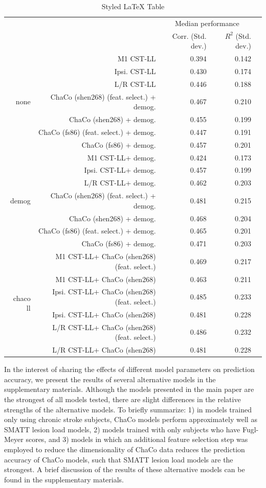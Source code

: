 \documentclass[10pt]{article}
\begin{document}
\begin{table}[h]
\centering
\caption{Styled LaTeX Table}
\label{table:5}
\begin{tabular}{rrrrr}
\toprule
 &  & \multicolumn{2}{c}{Median performance} \\
 &  & Corr. (Std. dev.) & $R^2$ (Std. dev.) \\
\midrule
\multirow[t]{7}{*}{none} & M1 CST-LL & 0.394 & 0.142 \\
 & Ipsi. CST-LL & 0.430 & 0.174 \\
 & L/R CST-LL & 0.446 & 0.188 \\
 & ChaCo (shen268) (feat. select.) + demog. & 0.467 & 0.210 \\
 & ChaCo (shen268) + demog. & 0.455 & 0.199 \\
 & ChaCo (fs86) (feat. select.) + demog. & 0.447 & 0.191 \\
 & ChaCo (fs86) + demog. & 0.457 & 0.201 \\
\multirow[t]{7}{*}{demog} & M1 CST-LL+ demog. & 0.424 & 0.173 \\
 & Ipsi. CST-LL+ demog. & 0.457 & 0.199 \\
 & L/R CST-LL+ demog. & 0.462 & 0.203 \\
 & ChaCo (shen268) (feat. select.) + demog. & 0.481 & 0.215 \\
 & ChaCo (shen268) + demog. & 0.468 & 0.204 \\
 & ChaCo (fs86) (feat. select.) + demog. & 0.465 & 0.201 \\
 & ChaCo (fs86) + demog. & 0.471 & 0.203 \\
\multirow[t]{6}{*}{chaco ll} & M1 CST-LL+ ChaCo (shen268) (feat. select.) & 0.469 & 0.217 \\
 & M1 CST-LL+ ChaCo (shen268) & 0.463 & 0.211 \\
 & Ipsi. CST-LL+ ChaCo (shen268) (feat. select.) & 0.485 & 0.233 \\
 & Ipsi. CST-LL+ ChaCo (shen268) & 0.481 & 0.228 \\
 & L/R CST-LL+ ChaCo (shen268) (feat. select.) & 0.486 & 0.232 \\
 & L/R CST-LL+ ChaCo (shen268) & 0.481 & 0.228 \\
\bottomrule
\end{tabular}
\end{table}

In the interest of sharing the effects of different model parameters on prediction accuracy, we present the results of several alternative models in the supplementary materials. Although the models presented in the main paper are the strongest of all models tested, there are slight differences in the relative strengths of the alternative models. To briefly summarize: 1) in models trained only using chronic stroke subjects, ChaCo models perform approximately well as SMATT lesion load models, 2) models trained with only subjects who have Fugl-Meyer scores, and 3) models in which an additional feature selection step was employed to reduce the dimensionality of ChaCo data reduces the prediction accuracy of ChaCo models, such that SMATT lesion load models are the strongest. A brief discussion of the results of these alternative models can be found in the supplementary materials.
\end{document}
